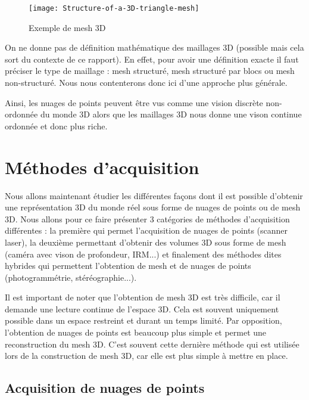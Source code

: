\begin{figure}[h]
    \centering
    \texttt{[image: Structure-of-a-3D-triangle-mesh]}
    \caption{Exemple de mesh 3D}
    \label{fig:Structure-of-a-3D-triangle-mesh}
\end{figure}
\FloatBarrier



On ne donne pas de définition mathématique des maillages 3D (possible mais cela sort du contexte de ce rapport). En effet, pour avoir une définition exacte il faut préciser le type de maillage : mesh structuré, mesh structuré par blocs ou mesh non-structuré.
Nous nous contenterons donc ici d'une approche plus générale.

Ainsi, les nuages de points peuvent être vus comme une vision discrète non-ordonnée du monde 3D alors que les maillages 3D nous donne une vison continue ordonnée et donc plus riche.
\FloatBarrier


\section{Méthodes d'acquisition}
Nous allons maintenant étudier les différentes façons dont il est possible d'obtenir une représentation 3D du monde réel sous forme de nuages de points ou de mesh 3D. Nous allons pour ce faire présenter 3 catégories de méthodes d'acquisition différentes : la première qui permet l'acquisition de nuages de points (scanner laser), la deuxième permettant d'obtenir des volumes 3D sous forme de mesh (caméra avec vison de profondeur, IRM...) et finalement des méthodes dites hybrides qui permettent l'obtention de mesh et de nuages de points (photogrammétrie, stéréographie...).

Il est important de noter que l'obtention de mesh 3D est très difficile, car il demande une lecture continue de l'espace 3D. Cela est souvent uniquement possible dans un espace restreint et durant un temps limité. Par opposition, l'obtention de nuages de points est beaucoup plus simple et permet une reconstruction du mesh 3D. C'est souvent cette dernière méthode qui est utilisée lors de la construction de mesh 3D, car elle est plus simple à mettre en place.
\subsection{Acquisition de nuages de points}
